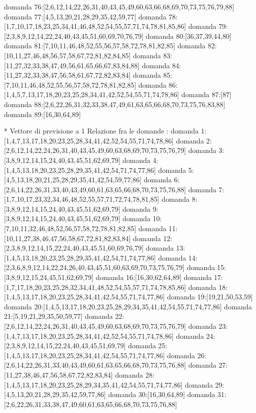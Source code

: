 domanda 76:[2,6,12,14,22,26,31,40,43,45,49,60,63,66,68,69,70,73,75,76,79,88]
domanda 77:[4,5,13,20,21,28,29,35,42,59,77]
domanda 78:[1,7,10,17,18,23,25,34,41,46,48,52,54,55,57,71,74,78,81,85,86]
domanda 79:[2,3,8,9,12,14,22,24,40,43,45,51,60,69,70,76,79]
domanda 80:[36,37,39,44,80]
domanda 81:[7,10,11,46,48,52,55,56,57,58,72,78,81,82,85]
domanda 82:[10,11,27,46,48,56,57,58,67,72,81,82,84,85]
domanda 83:[11,27,32,33,38,47,49,56,61,65,66,67,83,84,88]
domanda 84:[11,27,32,33,38,47,56,58,61,67,72,82,83,84]
domanda 85:[7,10,11,46,48,52,55,56,57,58,72,78,81,82,85]
domanda 86:[1,4,5,7,13,17,18,20,23,25,28,34,41,42,52,54,55,71,74,78,86]
domanda 87:[87]
domanda 88:[2,6,22,26,31,32,33,38,47,49,61,63,65,66,68,70,73,75,76,83,88]
domanda 89:[16,30,64,89]


* Vettore di previsione a 1
Relazione fra le domande :
domanda 1:[1,4,7,13,17,18,20,23,25,28,34,41,42,52,54,55,71,74,78,86]
domanda 2:[2,6,12,14,22,24,26,31,40,43,45,49,60,63,68,69,70,73,75,76,79]
domanda 3:[3,8,9,12,14,15,24,40,43,45,51,62,69,79]
domanda 4:[1,4,5,13,18,20,23,25,28,29,35,41,42,54,71,74,77,86]
domanda 5:[4,5,13,18,20,21,25,28,29,35,41,42,54,59,77,86]
domanda 6:[2,6,14,22,26,31,33,40,43,49,60,61,63,65,66,68,70,73,75,76,88]
domanda 7:[1,7,10,17,23,32,34,46,48,52,55,57,71,72,74,78,81,85]
domanda 8:[3,8,9,12,14,15,24,40,43,45,51,62,69,79]
domanda 9:[3,8,9,12,14,15,24,40,43,45,51,62,69,79]
domanda 10:[7,10,11,32,46,48,52,56,57,58,72,78,81,82,85]
domanda 11:[10,11,27,38,46,47,56,58,67,72,81,82,83,84]
domanda 12:[2,3,8,9,12,14,15,22,24,40,43,45,51,60,69,76,79]
domanda 13:[1,4,5,13,18,20,23,25,28,29,35,41,42,54,71,74,77,86]
domanda 14:[2,3,6,8,9,12,14,22,24,26,40,43,45,51,60,63,69,70,73,75,76,79]
domanda 15:[3,8,9,12,15,24,45,51,62,69,79]
domanda 16:[16,30,62,64,89]
domanda 17:[1,7,17,18,20,23,25,28,32,34,41,48,52,54,55,57,71,74,78,85,86]
domanda 18:[1,4,5,13,17,18,20,23,25,28,34,41,42,54,55,71,74,77,86]
domanda 19:[19,21,50,53,59]
domanda 20:[1,4,5,13,17,18,20,23,25,28,29,34,35,41,42,54,55,71,74,77,86]
domanda 21:[5,19,21,29,35,50,59,77]
domanda 22:[2,6,12,14,22,24,26,31,40,43,45,49,60,63,68,69,70,73,75,76,79]
domanda 23:[1,4,7,13,17,18,20,23,25,28,34,41,42,52,54,55,71,74,78,86]
domanda 24:[2,3,8,9,12,14,15,22,24,40,43,45,51,69,79]
domanda 25:[1,4,5,13,17,18,20,23,25,28,34,41,42,54,55,71,74,77,86]
domanda 26:[2,6,14,22,26,31,33,40,43,49,60,61,63,65,66,68,70,73,75,76,88]
domanda 27:[11,27,38,46,47,56,58,67,72,82,83,84]
domanda 28:[1,4,5,13,17,18,20,23,25,28,29,34,35,41,42,54,55,71,74,77,86]
domanda 29:[4,5,13,20,21,28,29,35,42,59,77,86]
domanda 30:[16,30,64,89]
domanda 31:[2,6,22,26,31,33,38,47,49,60,61,63,65,66,68,70,73,75,76,88]
